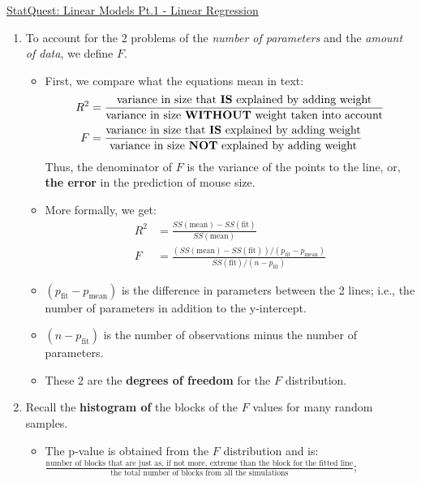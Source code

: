 \documentclass[12pt, titlepage, french]{report}
\begin{document}
\begin{YTB_SUMM}{\href{https://www.youtube.com/watch?v=nk2CQITm_eo&list=PLblh5JKOoLUIzaEkCLIUxQFjPIlapw8nU&index=2}{StatQuest: Linear Models Pt.1 - Linear Regression}}
\begin{enumerate}
\begin{itemize}
		\item	However, this is true for any 2 points with a line connecting them.
		\item	Therefore, we want a measure of the significance of the $R^{2}$, we want a \textbf{p-value}.
	\end{itemize}
	\item	To account for the 2 problems of the \textit{number of parameters} and the \textit{amount of data}, we define $F$. 
	\begin{itemize}
		\item	First, we compare what the equations mean in text:	
\setlength{\mathindent}{-2cm}				
		\begin{align*}
			R^{2}	&=	\frac{\text{variance in size that \textbf{IS} explained by adding weight}}{\text{variance in size \textbf{WITHOUT} weight taken into account}}	\\
			F	&=	\frac{\text{variance in size that \textbf{IS} explained by adding weight}}{\text{variance in size \textbf{NOT} explained by adding weight}}	
		\end{align*}
		Thus, the denominator of $F$ is the variance of the points to the line, or, \textbf{the error} in the prediction of mouse size.
		\item	More formally, we get:
		\begin{align*}
			R^{2}	&=	\frac{SS(\text{mean}) - SS(\text{fit})}{SS(\text{mean})}	\\
			F	&=	\frac{\left(SS(\text{mean}) - SS(\text{fit})\right)/\left(p_{\text{fit}} - p_{\text{mean}}\right)}{SS(\text{fit})/\left(n - p_{\text{fit}}\right)}
	\end{align*}
\setlength{\mathindent}{1cm}
		\item	$\left(p_{\text{fit}} - p_{\text{mean}}\right)$ is the difference in parameters between the 2 lines; i.e., the number of parameters in addition to the y-intercept.
		\item	$\left(n - p_{\text{fit}}\right)$ is the number of observations minus the number of parameters.
		\item	These 2 are the \textbf{degrees of freedom} for the $F$ distribution.		
	\end{itemize}
	\item	Recall the \textbf{histogram of} the blocks of the $F$ values for many random samples.
	\begin{itemize}
		\item	The p-value is obtained from the $F$ distribution and is: 
		$\frac{\text{number of blocks that are just as, if not more, extreme than the block for the fitted line}}{\text{the total number of blocks from all the simulations}}$;

\end{itemize}
\end{enumerate}
\end{YTB_SUMM}
\end{document}
